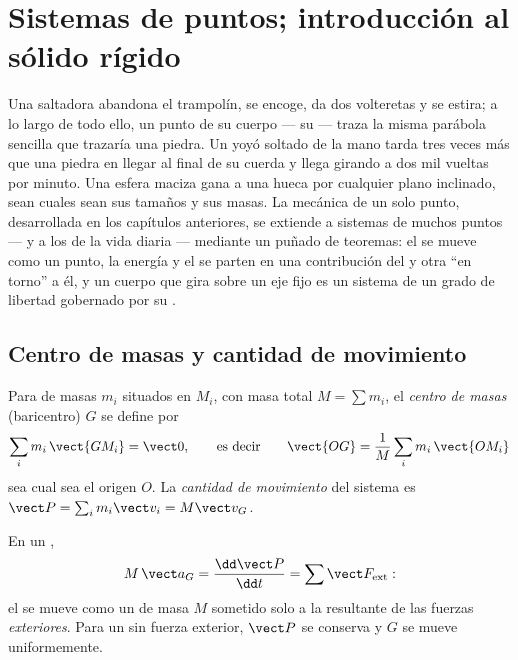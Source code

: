 \chapter{Sistemas de puntos; introducción al sólido rígido}\label{ch:b1:systems-of-points}

Una saltadora abandona el trampolín, se encoge, da dos volteretas y se
estira; a lo largo de todo ello, un punto de su cuerpo --- su  --- traza la misma parábola sencilla que trazaría una piedra. Un
yoyó soltado de la mano tarda tres veces más que una piedra en llegar al
final de su cuerda y llega girando a dos mil vueltas por minuto. Una
esfera maciza gana a una hueca por cualquier plano inclinado, sean cuales
sean sus tamaños y sus masas. La mecánica de un solo punto, desarrollada
en los capítulos anteriores, se extiende a sistemas de muchos puntos ---
y a los  de la vida diaria --- mediante un puñado de
teoremas: el  se mueve como un punto, la energía y el
 se parten en una contribución del  y otra
``en torno'' a él, y un cuerpo que gira sobre un eje fijo es un sistema
de un grado de libertad gobernado por su .

\section{Centro de masas y cantidad de movimiento}

\begin{definition}\label{def:b1:systems-of-points:cm}
Para  de masas $m_i$ situados en $M_i$, con masa total
$M = \sum m_i$, el \emph{centro de masas} (baricentro) $G$ se define por
\[
\sum_i m_i\,\vect{GM_i} = \vect 0, \qquad\text{es decir}\qquad
\vect{OG} = \frac{1}{M}\sum_i m_i\,\vect{OM_i}
\]
sea cual sea el origen $O$. La \emph{cantidad de movimiento} del sistema
es $\vect P =
\sum_i m_i\vect v_i = M\vect v_G$.
\end{definition}

\begin{theorem}\label{thm:b1:systems-of-points:cmtheorem}
En un ,
\[
M\,\vect a_G = \frac{\dd\vect P}{\dd t} = \sum\vect F_{\mathrm{ext}} :
\]
el  se mueve como un  de masa $M$ sometido
solo a la resultante de las fuerzas \emph{exteriores}. Para un  sin fuerza exterior, $\vect P$ se conserva y $G$ se mueve
uniformemente.
\end{theorem}


